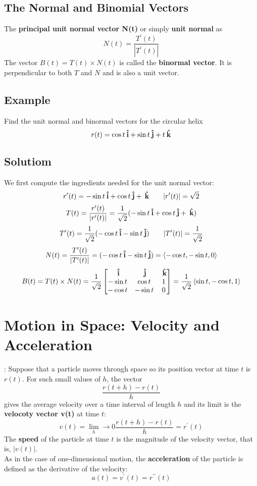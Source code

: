 \subsection*{The Normal and Binomial Vectors}
The \textbf{principal unit normal vector N(t)} or simply \textbf{unit normal} as $$N(t) = \frac{T^\prime(t)}{|T^\prime(t)|}$$
The vector $B(t) = T(t)\times N(t)$ is called the \textbf{binormal vector}. It is perpendicular to both $T$ and $N$ and is also a unit vector.

\subsection*{Example}
Find the unit normal and binormal vectors for the circular helix $$r(t) = \cos{t}\:\boldsymbol{\hat{\textbf{i}}} + \sin{t}\:\boldsymbol{\hat{\textbf{j}}} + t\:\boldsymbol{\hat{\textbf{k}}}$$
\subsection*{Solutiom}
We first compute the ingredients needed for the unit normal vector: 
$$r^\prime(t) = -\sin{t}\:\boldsymbol{\hat{\textbf{i}}} + \cos{t}\:\boldsymbol{\hat{\textbf{j}}} + \:\boldsymbol{\hat{\textbf{k}}}\qquad |r^\prime(t)| = \sqrt{2}$$
$$T(t) = \frac{r^\prime(t)}{|r^\prime(t)|} = \frac{1}{\sqrt{2}}(-\sin{t}\:\boldsymbol{\hat{\textbf{i}}} + \cos{t}\:\boldsymbol{\hat{\textbf{j}}} + \:\boldsymbol{\hat{\textbf{k}}})$$
$$T^\prime(t) = \frac{1}{\sqrt{2}}(-\cos{t}\:\boldsymbol{\hat{\textbf{i}}} - \sin{t}\:\boldsymbol{\hat{\textbf{j}}})\qquad |T^\prime(t)| = \frac{1}{\sqrt{2}}$$
$$N(t) = \frac{T^\prime(t)}{|T^\prime(t)|} = (-\cos{t}\ihat - \sin{t}\jhat) = \ev{-\cos{t}, -\sin{t}, 0}$$
$$B(t) = T(t)\times N(t) = \frac{1}{\sqrt{2}}\begin{bmatrix}
    \ihat&\jhat&\khat\\
    -\sin{t}&\cos{t}&1\\
    -\cos{t}&-\sin{t}&0
\end{bmatrix} = \frac{1}{\sqrt{2}}\ev{\sin{t}, -\cos{t}, 1}$$

\section{Motion in Space: Velocity and Acceleration}:
Suppose that a particle moves through space so its position vector at time $t$ is $r(t)$. For such small values of $h$, the vector 
$$\frac{r(t+h) - r(t)}{h}$$ gives the average velocity over a time interval of length $h$ and its limit is the \textbf{velocoty vector v(t)} at time $t$:
$$v(t) = \lim_h\rightarrow 0 \frac{r(t+h) - r(t)}{h} = r^\prime(t)$$
The \textbf{speed} of the particle at time $t$ is the magnitude of the velocity vector, that is, $|v(t)|$.\\
As in the case of one-dimensional motion, the \textbf{acceleration} of the particle is defined as the derivative of the velocity: 
$$a(t) = v^\prime(t) = r^{\prime\prime}(t)$$
